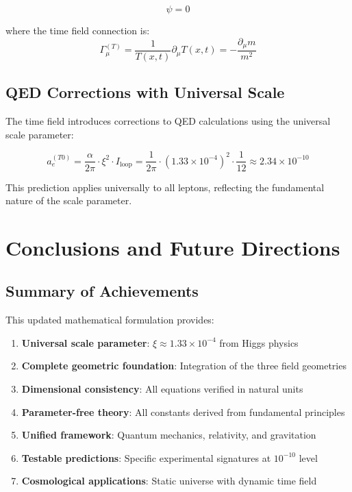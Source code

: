\documentclass[12pt,a4paper]{article}
\newcommand{\Tfield}{T(x,t)}
\newcommand{\xipar}{\xi}
\theoremstyle{definition}
\theoremstyle{remark}
\begin{document}
	\begin{equation}
		[i\gamma^{\mu}(\partial_{\mu} + \Gamma_{\mu}^{(T)}) - m(x,t)]\psi = 0
		\label{eq:t0_dirac}
	\end{equation}
	
	where the time field connection is:
	\begin{equation}
		\Gamma_{\mu}^{(T)} = \frac{1}{\Tfield} \partial_{\mu} \Tfield = -\frac{\partial_{\mu} m}{m^2}
		\label{eq:time_field_connection}
	\end{equation}
	
	\subsection{QED Corrections with Universal Scale}
	\label{subsec:qed_corrections_universal}
	
	The time field introduces corrections to QED calculations using the universal scale parameter:
	
	\begin{equation}
		a_e^{(T0)} = \frac{\alpha}{2\pi} \cdot \xipar^2 \cdot I_{\text{loop}} = \frac{1}{2\pi} \cdot (1.33 \times 10^{-4})^2 \cdot \frac{1}{12} \approx 2.34 \times 10^{-10}
		\label{eq:anomalous_moment_correction}
	\end{equation}
	
	This prediction applies universally to all leptons, reflecting the fundamental nature of the scale parameter.
	
	\section{Conclusions and Future Directions}
	\label{sec:conclusions}
	
	\subsection{Summary of Achievements}
	\label{subsec:summary_achievements}
	
	This updated mathematical formulation provides:
	
	\begin{enumerate}
		\item \textbf{Universal scale parameter}: $\xi \approx 1.33 \times 10^{-4}$ from Higgs physics
		\item \textbf{Complete geometric foundation}: Integration of the three field geometries
		\item \textbf{Dimensional consistency}: All equations verified in natural units
		\item \textbf{Parameter-free theory}: All constants derived from fundamental principles
		\item \textbf{Unified framework}: Quantum mechanics, relativity, and gravitation
		\item \textbf{Testable predictions}: Specific experimental signatures at $10^{-10}$ level
		\item \textbf{Cosmological applications}: Static universe with dynamic time field
	\end{enumerate}
	
\end{document}

